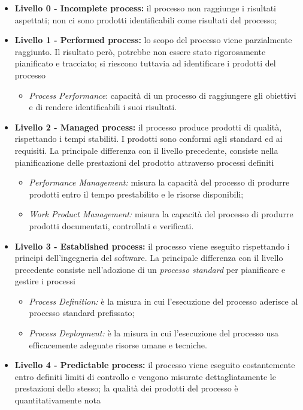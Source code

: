 \begin{itemize}
	\item \textbf{Livello 0 - Incomplete process:} il processo non raggiunge i risultati aspettati; non ci sono prodotti identificabili come risultati del processo;
	\item \textbf{Livello 1 - Performed process:} lo scopo del processo viene parzialmente raggiunto. Il risultato però, potrebbe non essere stato rigorosamente pianificato e tracciato; si riescono tuttavia ad identificare i prodotti del processo
		\begin{itemize}
	 		\item \textit{Process Performance}: capacità di un processo di raggiungere gli obiettivi e di rendere identificabili i suoi risultati.
	 	\end{itemize}
	 \item \textbf{Livello 2 - Managed process:} il processo produce prodotti di qualità, rispettando i tempi stabiliti. I prodotti sono conformi agli standard ed ai requisiti. La principale differenza con il livello precedente, consiste nella pianificazione delle prestazioni del prodotto attraverso processi definiti
		\begin{itemize}
	 		\item \textit{Performance Management:} misura la capacità del processo di produrre prodotti entro il tempo prestabilito e le risorse disponibili;
	 		\item \textit{Work Product Management:} misura la capacità del processo di produrre prodotti documentati, controllati e verificati.
	 	\end{itemize}
	 \item \textbf{Livello 3 - Established process:} il processo viene eseguito rispettando i principi dell'ingegneria del software. La principale differenza con il livello precedente consiste nell'adozione di un \textit{processo standard} per pianificare e gestire i processi
		\begin{itemize}
	 		\item \textit{Process Definition:} è la misura in cui l'esecuzione del processo aderisce al processo standard prefissato;
	 		\item \textit{Process Deployment:} è la misura in cui l'esecuzione del processo usa efficacemente adeguate risorse umane e tecniche.
	 	\end{itemize}
	 \item \textbf{Livello 4 - Predictable process:} il processo viene eseguito costantemente entro definiti limiti di controllo e vengono misurate dettagliatamente le prestazioni dello stesso; la qualità dei prodotti del processo è quantitativamente nota

\end{itemize}
